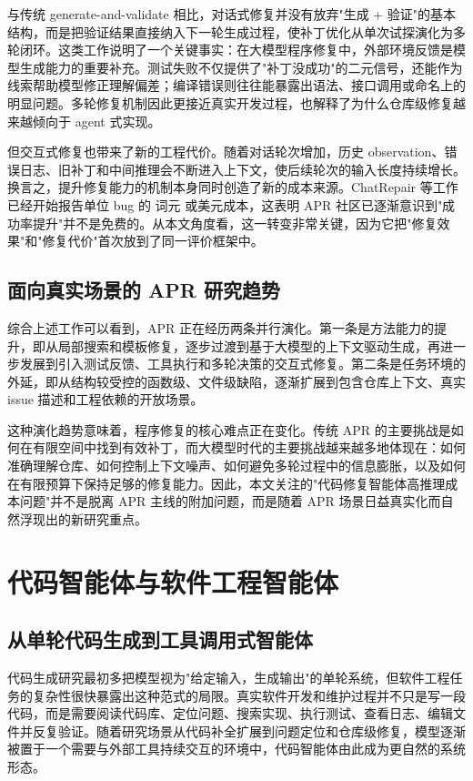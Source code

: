 与传统 generate-and-validate 相比，对话式修复并没有放弃"生成 + 验证"的基本结构，而是把验证结果直接纳入下一轮生成过程，使补丁优化从单次试探演化为多轮闭环。这类工作说明了一个关键事实：在大模型程序修复中，外部环境反馈是模型生成能力的重要补充。测试失败不仅提供了"补丁没成功"的二元信号，还能作为线索帮助模型修正理解偏差；编译错误则往往能暴露出语法、接口调用或命名上的明显问题。多轮修复机制因此更接近真实开发过程，也解释了为什么仓库级修复越来越倾向于 agent 式实现。

但交互式修复也带来了新的工程代价。随着对话轮次增加，历史 observation、错误日志、旧补丁和中间推理会不断进入上下文，使后续轮次的输入长度持续增长。换言之，提升修复能力的机制本身同时创造了新的成本来源。ChatRepair 等工作已经开始报告单位 bug 的 词元 或美元成本，这表明 APR 社区已逐渐意识到"成功率提升"并不是免费的。从本文角度看，这一转变非常关键，因为它把"修复效果"和"修复代价"首次放到了同一评价框架中。

\subsection{面向真实场景的 APR 研究趋势}

综合上述工作可以看到，APR 正在经历两条并行演化。第一条是方法能力的提升，即从局部搜索和模板修复，逐步过渡到基于大模型的上下文驱动生成，再进一步发展到引入测试反馈、工具执行和多轮决策的交互式修复。第二条是任务环境的外延，即从结构较受控的函数级、文件级缺陷，逐渐扩展到包含仓库上下文、真实 issue 描述和工程依赖的开放场景。

这种演化趋势意味着，程序修复的核心难点正在变化。传统 APR 的主要挑战是如何在有限空间中找到有效补丁，而大模型时代的主要挑战越来越多地体现在：如何准确理解仓库、如何控制上下文噪声、如何避免多轮过程中的信息膨胀，以及如何在有限预算下保持足够的修复能力。因此，本文关注的"代码修复智能体高推理成本问题"并不是脱离 APR 主线的附加问题，而是随着 APR 场景日益真实化而自然浮现出的新研究重点。


\section{代码智能体与软件工程智能体}

\subsection{从单轮代码生成到工具调用式智能体}

代码生成研究最初多把模型视为"给定输入，生成输出"的单轮系统，但软件工程任务的复杂性很快暴露出这种范式的局限。真实软件开发和维护过程并不只是写一段代码，而是需要阅读代码库、定位问题、搜索实现、执行测试、查看日志、编辑文件并反复验证。随着研究场景从代码补全扩展到问题定位和仓库级修复，模型逐渐被置于一个需要与外部工具持续交互的环境中，代码智能体由此成为更自然的系统形态。

